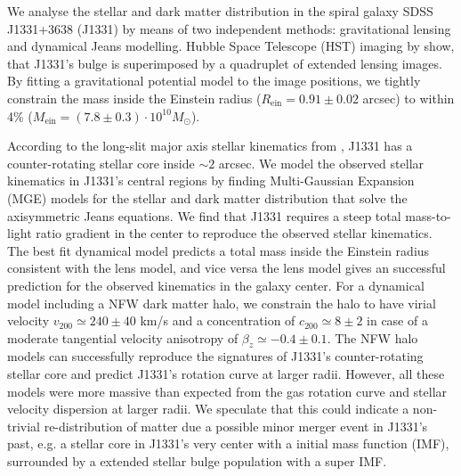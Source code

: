 We analyse the stellar and dark matter distribution in the spiral galaxy SDSS J1331+3638 (J1331) by means of two independent methods: gravitational lensing and dynamical Jeans modelling. Hubble Space Telescope (HST) imaging by \citet{SWELLSI} show, that J1331's bulge is superimposed by a quadruplet of extended lensing images. By fitting a gravitational potential model to the image positions, we tightly constrain the mass inside the Einstein radius ($R_\text{ein}=0.91\pm0.02$ arcsec) to within 4\% ($M_\text{ein} = (7.8\pm0.3) \cdot 10^{10} M_\odot$). 

According to the long-slit major axis stellar kinematics from \citet{SWELLSV}, J1331 has a counter-rotating stellar core inside $\sim 2$ arcsec. We model the observed stellar kinematics in J1331's central regions by finding Multi-Gaussian Expansion (MGE) models for the stellar and dark matter distribution that solve the axisymmetric Jeans equations. We find that J1331 requires a steep total mass-to-light ratio gradient in the center to reproduce the observed stellar kinematics. The best fit dynamical model predicts a total mass inside the Einstein radius consistent with the lens model, and vice versa the lens model gives an successful prediction for the observed kinematics in the galaxy center. For a dynamical model including a NFW dark matter halo,  we constrain the halo to have virial velocity $v_{200} \simeq 240 \pm 40$ km/s and a concentration of $c_{200} \simeq 8 \pm 2$ in case of a moderate tangential velocity anisotropy of $\beta_z \simeq −0.4 \pm 0.1$. The NFW halo models can successfully reproduce the signatures of J1331's counter-rotating stellar core and predict J1331's rotation curve at larger radii. However, all these models were more massive than expected from the gas rotation curve and stellar velocity dispersion at larger radii. We speculate that this could indicate a non-trivial re-distribution of matter due a possible minor merger event in J1331's past, e.g. a stellar core in J1331's very center with a \citet{Chabrier2003} initial mass function (IMF), surrounded by a extended stellar bulge population with a super \citet{Salpeter1955} IMF.